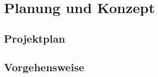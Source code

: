 \chapter{Planung und Konzept} \label{planung}



\section{Projektplan} %



\section{Vorgehensweise} %
